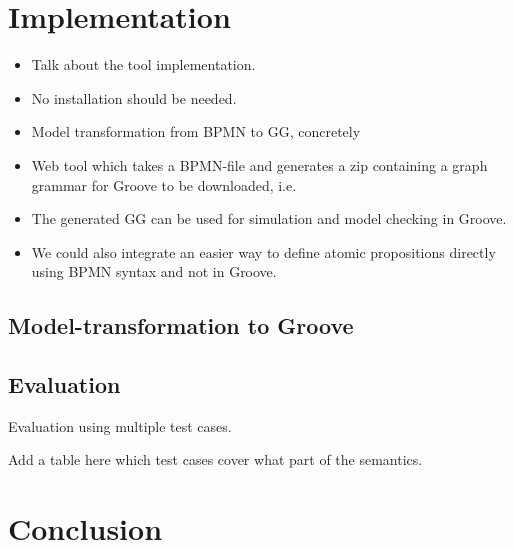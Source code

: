 \documentclass[adraft, copyright, creativecommons]{eptcs} %
\begin{document}
\section{Implementation}
\begin{itemize}
    \item Talk about the tool implementation.
    \item No installation should be needed.
    \item Model transformation from BPMN to GG, concretely
    \item Web tool which takes a BPMN-file and generates a zip containing a graph grammar for Groove to be downloaded, i.e.
    \item The generated GG can be used for simulation and model checking in Groove.
    \item We could also integrate an easier way to define atomic propositions directly using BPMN syntax and not in Groove.
\end{itemize}
\subsection{Model-transformation to Groove}
\subsection{Evaluation}
Evaluation using multiple test cases.

Add a table here which test cases cover what part of the semantics.
\section{Conclusion}


\end{document}
